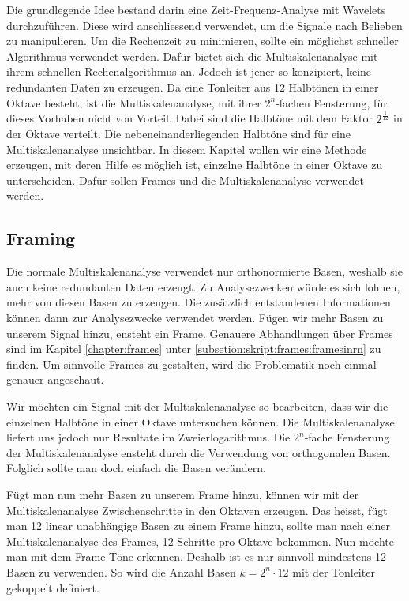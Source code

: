 



Die grundlegende Idee bestand darin eine Zeit-Frequenz-Analyse mit Wavelets durchzuführen. Diese wird anschliessend verwendet, um die Signale nach Belieben zu manipulieren. Um die Rechenzeit zu minimieren, sollte ein möglichst schneller Algorithmus verwendet werden. Dafür bietet sich die Multiskalenanalyse mit ihrem schnellen Rechenalgorithmus an. Jedoch ist jener so konzipiert, keine redundanten Daten zu erzeugen. Da eine Tonleiter aus 12 Halbtönen in einer Oktave besteht, ist die Multiskalenanalyse, mit ihrer $2^{n}$-fachen Fensterung, für dieses Vorhaben nicht von Vorteil. Dabei sind die Halbtöne mit dem Faktor $2^{\frac{1}{12}}$ in der Oktave verteilt. Die nebeneinanderliegenden Halbtöne sind für eine Multiskalenanalyse unsichtbar. 
In diesem Kapitel wollen wir eine Methode erzeugen, mit deren Hilfe es möglich ist, einzelne Halbtöne in einer Oktave zu unterscheiden. Dafür sollen Frames und die Multiskalenanalyse verwendet werden.




\subsection{Framing}

Die normale Multiskalenanalyse verwendet nur orthonormierte Basen, weshalb sie auch keine redundanten Daten erzeugt. Zu Analysezwecken würde es sich lohnen, mehr von diesen Basen zu erzeugen. Die zusätzlich entstandenen Informationen können dann zur Analysezwecke verwendet werden. Fügen wir mehr Basen zu unserem Signal hinzu, ensteht ein Frame. Genauere Abhandlungen über Frames sind im Kapitel \ref{chapter:frames} unter \ref{subsetion:skript:frames:framesinrn} zu finden. Um sinnvolle Frames zu gestalten, wird die Problematik noch einmal genauer angeschaut.

Wir möchten ein Signal mit der Multiskalenanalyse so bearbeiten, dass wir die einzelnen Halbtöne in einer Oktave untersuchen können. Die Multiskalenanalyse liefert uns jedoch nur Resultate im Zweierlogarithmus. Die $2^{n}$-fache Fensterung der Multiskalenanalyse ensteht durch die Verwendung von orthogonalen Basen. Folglich sollte man doch einfach die Basen verändern.

Fügt man nun mehr Basen zu unserem Frame hinzu, können wir mit der Multiskalenanalyse Zwischenschritte in den Oktaven erzeugen. Das heisst, fügt man 12 linear unabhängige Basen zu einem Frame hinzu, sollte man nach einer Multiskalenanalyse des Frames, 12 Schritte pro Oktave bekommen. Nun möchte man mit dem Frame Töne erkennen. Deshalb ist es nur sinnvoll mindestens 12 Basen zu verwenden. So wird die Anzahl Basen $k= 2^{n} \cdot 12$
mit der Tonleiter gekoppelt
definiert.

